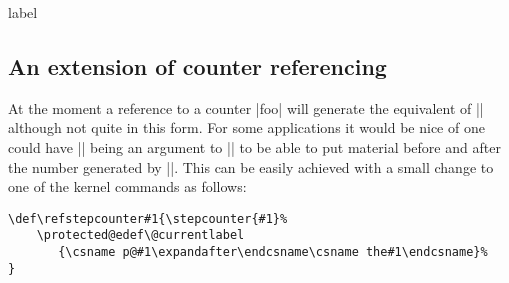   \begin{docCommand}{label}{}
  \end{docCommand}




 \subsection{An extension of counter referencing}


 At the moment a reference to a counter |foo| will generate the
 equivalent of |\p@foo\thefoo| although not quite in this form.  For
 some applications it would be nice of one could have |\thefoo| being
 an argument to |\p@foo| to be able to put material before and after
 the number generated by |\thefoo|. This can be easily achieved with
 a small change to one of the kernel commands as follows:

\begin{verbatim}
\def\refstepcounter#1{\stepcounter{#1}%
    \protected@edef\@currentlabel
       {\csname p@#1\expandafter\endcsname\csname the#1\endcsname}%
}
\end{verbatim}

